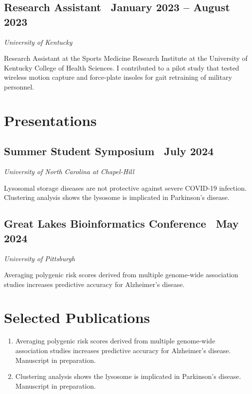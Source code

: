 \documentclass{article}
\begin{document}
\begin{flushleft}
\subsection*{Research Assistant {\hfill\normalsize\normalfont\ January 2023 -- August 2023}}
\textit{University of Kentucky \vspace{0.5em}}

Research Assistant at the Sports Medicine Research Institute at the University of Kentucky College of Health Sciences. 
I contributed to a pilot study that tested wireless motion capture and force-plate insoles for gait retraining of military
personnel. 

\section*{Presentations}
\subsection*{Summer Student Symposium {\hfill\normalsize\normalfont\ July 2024}}
\textit{University of North Carolina at Chapel-Hill}

Lysosomal storage diseases are not protective against severe COVID-19 infection. Clustering analysis shows the lysosome is implicated in Parkinson's disease.

\subsection*{Great Lakes Bioinformatics Conference {\hfill\normalsize\normalfont\ May 2024}}
\textit{University of Pittsburgh \vspace{0.5em}}

Averaging polygenic risk scores derived from multiple genome-wide association studies increases predictive accuracy for Alzheimer’s disease.

\section*{Selected Publications}
\begin{enumerate}
\item Averaging polygenic risk scores derived from multiple genome-wide association studies increases predictive accuracy for Alzheimer’s disease. Manuscript in preparation.
\item Clustering analysis shows the lysosome is implicated in Parkinson's disease. Manuscript in preparation.
\end{enumerate}


\end{flushleft}
\end{document}
